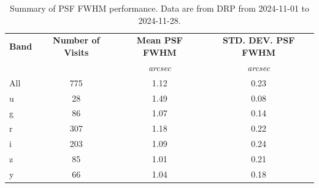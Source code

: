 \begin{table}
\centering
\begin{tabular}{@{}lccc@{}}
\textbf{Band} & \textbf{Number of Visits} & \textbf{Mean PSF FWHM} & \textbf{STD. DEV. PSF FWHM} \\
 & & \textit{arcsec} & \textit{arcsec} \\
  \hline
All           & 775                      & 1.12                   & 0.23                  \\
u             & 28                       & 1.49                   & 0.08                  \\
g             & 86                       & 1.07                   & 0.14                  \\
r             & 307                      & 1.18                   & 0.22                  \\
i             & 203                      & 1.09                   & 0.24                  \\
z             & 85                       & 1.01                   & 0.21                  \\
y             & 66                       & 1.04                   & 0.18                  \\
\end{tabular}
\caption{Summary of PSF FWHM performance. Data are from DRP from 2024-11-01 to 2024-11-28.}
\label{tab:psf_summary}
\end{table}

